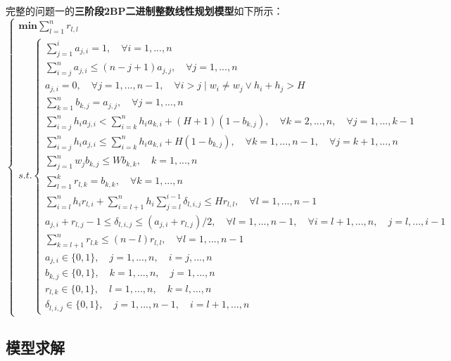 \documentclass[bwprint]{gmcmthesis}
\begin{document}
完整的问题一的\textbf{三阶段2BP二进制整数线性规划模型}如下所示：
\begin{equation}
    \begin{cases}
        \mathbf{min}  \sum_{l=1}^{n}  r_{l,l} \\
        s.t.
        \begin{cases}
            \sum_{j=1}^{i}  a_{j,i} =1,\quad \forall i=1,...,n \\
            \sum_{i=j}^{n}  a_{j,i} \le (n-j+1)a_{j,j},\quad \forall j=1,...,n  \\
            a_{j,i}=0, \quad \forall j=1,...,n-1,\quad  \forall i>j \mid w_i \neq w_j \vee h_i+h_j>H\\
            \sum_{k=1}^{n}  b_{k,j} =a_{j,j},\quad \forall j=1,...,n  \\
            \sum_{i=j}^{n} h_ia_{j,i}<\sum_{i=k}^n h_i a_{k,i}+(H+1)(1-b_{k,j}),\quad  \forall  k=2,...,n,\quad  \forall j=1,...,k-1 \\
            \sum_{i=j}^{n} h_ia_{j,i} \le \sum_{i=k}^n h_i a_{k,i}+H(1-b_{k,j}), \quad  \forall k=1,...,n-1, \quad \forall j=k+1,...,n \\
            \sum_{j=1}^{n} w_j b_{k,j} \le W b_{k,k}, \quad k=1,...,n \\
            \sum_{l=1}^{k} r_{l,k} = b_{k,k}, \quad \forall k=1,...,n \\
            \sum_{i=l}^{n} h_i r_{l,i} +\sum_{i=l+1}^{n} h_i \sum_{j=l}^{i-1} \delta_{l,i,j} \le H r_{l,l}, \quad \forall l=1,...,n-1 \\
            a_{j,i}+r_{l,j}-1 \le \delta_{l,i,j} \le (a_{j,i}+r_{l,j})/2, \quad \forall l=1,...,n-1,\quad \forall i=l+1,...,n,\quad j=l,...,i-1 \\
           \sum_{k=l+1}^{n} r_{l.k} \le (n-l)r_{l,l}, \quad \forall l=1,...,n-1 \\
            a_{j,i} \in \{0,1\}, \quad j=1,...,n , \quad i=j,...,n \\
            b_{k,j} \in \{0,1\}, \quad k=1,...,n , \quad j=1,...,n \\
            r_{l,k} \in \{0,1\}, \quad l=1,...,n , \quad k=l,...,n \\
            \delta_{l,i,j} \in \{0,1\}, \quad j=1,...,n-1 , \quad i=l+1,...,n 
        \end{cases}  \label{问题一模型}
    \end{cases}
\end{equation}


\subsection{模型求解}
	
\end{document}
